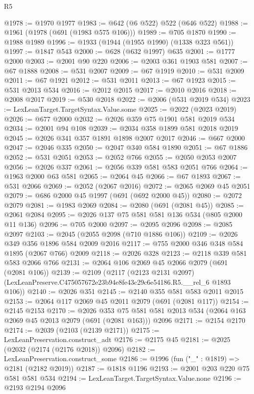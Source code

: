 \begin{lexlean}{R5}
\begin{coremodule}
@1978 := @1970 @1977
@1983 := @642 (@6 @522) @522 (@646 @522)
@1988 := @1961 (@1978 (@691 (@1983 @575 @106)))
@1989 := @705 @1870
@1990 := @1988 @1989
@1996 := @1933 (@1944 (@1955 @1990) (@1338 @323 @561))
@1997 := @1847 @543
@2000 := @628 (@632 @1997) @635
@2001 := @1777 @2000
@2003 := @2001 @90 @220
@2006 := @2003 @361 @1903 @581
@2007 := @67 @1888
@2008 := @531 @2007
@2009 := @67 @1919
@2010 := @531 @2009
@2011 := @67 @1921
@2012 := @531 @2011
@2013 := @67 @1923
@2015 := @531 @2013 @534
@2016 := @2012 @2015
@2017 := @2010 @2016
@2018 := @2008 @2017
@2019 := @530 @2018
@2022 := @2006 (@531 @2019 @534)
@2023 := LexLeanTarget.TargetSyntax.Value.some
@2025 := @2022 (@2023 @2019)
@2026 := @677 @2000
@2032 := @2026 @359 @75 @1901 @581 @2019 @534
@2034 := @2001 @94 @108
@2039 := @2034 @358 @1899 @581 @2018 @2019
@2045 := @2026 @341 @357 @1891 @1898 @2007 @2017
@2046 := @667 @2000
@2047 := @2046 @335
@2050 := @2047 @340 @584 @1890
@2051 := @67 @1886
@2052 := @531 @2051
@2053 := @2052 @766
@2055 := @2050 @2053 @2007
@2056 := @2026 @337
@2061 := @2056 @339 @581 @583 @2051 @766
@2064 := @1963 @2000 @63 @581
@2065 := @2064 @45
@2066 := @67 @1893
@2067 := @531 @2066
@2069 := @2052 (@2067 @2016)
@2072 := @2065 @2069 @45 @2051
@2079 := @686 @2000 @45 @1997 (@691 (@692 @2000 @45))
@2080 := @2072 @2079
@2081 := @1983 @2069
@2084 := @2080 (@691 (@2081 @45))
@2085 := @2061 @2084
@2095 := @2026 @137 @75 @581 @581 @136 @534 (@805 @2000 @11 @136)
@2096 := @705 @2000
@2097 := @2095 @2096
@2098 := @2085 @2097
@2103 := @2045 (@2055 @2098 (@710 @1886 @106))
@2109 := @2026 @349 @356 @1896 @584 @2009 @2016
@2117 := @755 @2000 @346 @348 @584 @1895 (@2067 @766) @2009
@2118 := @2026 @328
@2123 := @2118 @339 @581 @583 @2066 @766
@2131 := @2064 @106 @2069 @45 @2066 @2079 (@691 (@2081 @106))
@2139 := @2109
    (@2117
      (@2123 @2131 @2097)
      (LexLeanPreserve.C475057672e23b94e8fe43c29c6e54186.R5.__rel_6 @1893 @106))
@2140 := @2026 @351
@2145 := @2140 @355 @581 @583 @2011 @2015
@2153 := @2064 @117 @2069 @45 @2011 @2079 (@691 (@2081 @117))
@2154 := @2145 @2153
@2170 := @2026
    @353
    @75
    @581
    @581
    @2013
    @534
    (@2064 @163 @2069 @45 @2013 @2079 (@691 (@2081 @163)))
    @2096
@2171 := @2154 @2170
@2174 := @2039 (@2103 (@2139 @2171))
@2175 := LexLeanPreservation.construct_adt
@2176 := @2175 @45
@2181 := @2025 (@2032 (@2174 (@2176 @2018)) @2096)
@2182 := LexLeanPreservation.construct_some
@2186 := @1996 (fun ("_" : @1819) => @2181 (@2182 @2019))
@2187 := @1818 @1196
@2193 := @2001 @203 @220 @75 @581 @581 @534
@2194 := LexLeanTarget.TargetSyntax.Value.none
@2196 := @2193 @2194 @2096

\end{coremodule}
\end{lexlean}
